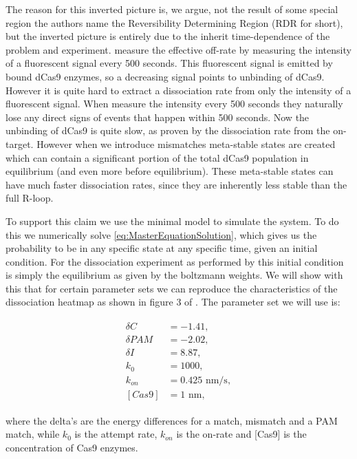 The reason for this inverted picture is, we argue, not the result of some special region the authors name the Reversibility Determining Region (RDR for short), but the inverted picture is entirely due to the inherit time-dependence of the problem and experiment. \cite{PNAS} measure the effective off-rate by measuring the intensity of a fluorescent signal every 500 seconds. This fluorescent signal is emitted by bound dCas9 enzymes, so a decreasing signal points to unbinding of dCas9. However it is quite hard to extract a dissociation rate from only the intensity of a fluorescent signal. When \cite{PNAS} measure the intensity every 500 seconds they naturally lose any direct signs of events that happen within 500 seconds. Now the unbinding of dCas9 is quite slow, as proven by the dissociation rate from the on-target. However when we introduce mismatches meta-stable states are created which can contain a significant portion of the total dCas9 population in equilibrium (and even more before equilibrium). These meta-stable states can have much faster dissociation rates, since they are inherently less stable than the full R-loop. 


To support this claim we use the minimal model to simulate the system. To do this we numerically solve \ref{eq:MasterEquationSolution}, which gives us the probability to be in any specific state at any specific time, given an initial condition. For the dissociation experiment as performed by \cite{PNAS} this initial condition is simply the equilibrium as given by the boltzmann weights. We will show with this that for certain parameter sets we can reproduce the characteristics of the dissociation heatmap as shown in figure 3 of \cite{PNAS}. The parameter set we will use is:

\begin{align}
\begin{split}
\delta C &= -1.41, \\
\delta PAM &= -2.02, \\
\delta I &= 8.87, \\
k_0 &= 1000, \\
k_{on} &= 0.425 \text{ nm/s}, \\
[Cas9] &= 1 \text{ nm},
\end{split}
\end{align}

where the delta's are the energy differences for a match, mismatch and a PAM match, while $k_0$ is the attempt rate, $k_{on}$ is the on-rate and [Cas9] is the concentration of Cas9 enzymes.

